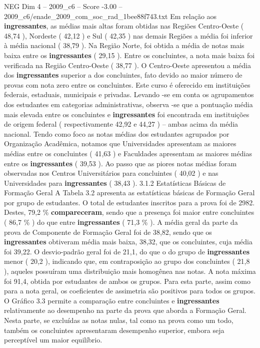 \begin{textsample}{NEG Dim 4 – 2009\_c6 – Score -3.00 – 2009\_c6/enade\_2009\_com\_soc\_rad\_1bee88f743.txt}
Em relação aos \textbf{ingressantes}, as médias mais altas foram obtidas nas Regiões Centro-Oeste ( 48,74 ), Nordeste ( 42,12 ) e Sul ( 42,35 ) nas demais Regiões a média foi inferior à média nacional ( 38,79 ).
Na Região Norte, foi obtida a média de notas mais baixa entre os \textbf{ingressantes} ( 29,15 ).
Entre os concluintes, a nota mais baixa foi verificada na Região Centro-Oeste ( 38,77 ).
O Centro-Oeste apresentou a média dos \textbf{ingressantes} superior a dos concluintes, fato devido ao maior número de provas com nota zero entre os concluintes.
Este curso é oferecido em instituições federais, estaduais, municipais e privadas.
Levando -se em conta os agrupamentos dos estudantes em categorias administrativas, observa -se que a pontuação média mais elevada entre os concluintes e \textbf{ingressantes} foi encontrada em instituições de origem federal ( respectivamente 42,92 e 44,27 ) – ambas acima da média nacional.
Tendo como foco as notas médias dos estudantes agrupados por Organização Acadêmica, notamos que Universidades apresentam as maiores médias entre os concluintes ( 41,63 ) e Faculdades apresentam as maiores médias entre os \textbf{ingressantes} ( 39,53 ).
Ao passo que as piores notas médias foram observadas nos Centros Universitários para concluintes ( 40,02 ) e nas Universidades para \textbf{ingressantes} ( 38,43 ). 3.1.2 Estatísticas Básicas de Formação Geral A Tabela 3.2 apresenta as estatísticas básicas de Formação Geral por grupo de estudantes.
O total de estudantes inscritos para a prova foi de 2982.
Destes, 79,2 \% \textbf{compareceram}, sendo que a presença foi maior entre concluintes ( 86,7 \% ) do que entre \textbf{ingressantes} ( 71,3 \% ).
A média geral da parte da prova de Componente de Formação Geral foi de 38,82, sendo que os \textbf{ingressantes} obtiveram média mais baixa, 38,32, que os concluintes, cuja média foi 39,22.
O desvio-padrão geral foi de 21,1, do que o do grupo de \textbf{ingressantes} menor ( 20,2 ), indicando que, em contraposição ao grupo dos concluintes ( 21,8 ), aqueles possuíram uma distribuição mais homogênea nas notas.
A nota máxima foi 91,4, obtida por estudantes de ambos os grupos.
Para esta parte, assim como para a nota geral, os coeficientes de assimetria são positivos para todos os grupos.
O Gráfico 3.3 permite a comparação entre concluintes e \textbf{ingressantes} relativamente ao desempenho na parte da prova que aborda a Formação Geral.
Nesta parte, se excluídas as notas nulas, tal como na prova como um todo, também os concluintes apresentaram desempenho superior, embora seja perceptível um maior equilíbrio.

\end{textsample}
